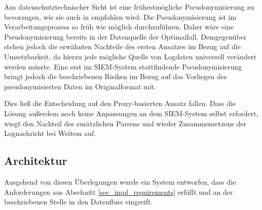 Aus datenschutztechnischer Sicht ist eine frühestmögliche Pseudonymisierung zu bevorzugen, wie sie auch in \cite{schwartmann2017} empfohlen wird: 
\glqq{}Die Pseudonymisierung ist im Verarbeitungsprozess so früh wie möglich durchzuführen.\grqq{}
Daher wäre eine Pseudonymisierung bereits in der Datenquelle der Optimalfall. Demgegenüber stehen jedoch die erwähnten Nachteile des ersten Ansatzes im Bezug auf die Umsetzbarkeit, da hierzu jede mögliche Quelle von Logdaten universell verändert werden müsste. Eine erst im SIEM-System stattfindende Pseudonymisierung bringt jedoch die beschriebenen Risiken im Bezug auf das Vorliegen des pseudonymisierten Daten im Originalformat mit.

Dies ließ die Entscheidung auf den Proxy-basierten Ansatz fallen. Dass die Lösung außerdem noch keine Anpassungen an dem SIEM-System selbst erfordert, wiegt den Nachteil des zusätzlichen Parsens und wieder Zusammensetzens der Lognachricht bei Weitem auf.

\subsection{Architektur}


Ausgehend von diesen Überlegungen wurde ein System entworfen, dass die Anforderungen aus Abschnitt \ref{sec_impl_requirements} erfüllt und an der beschriebenen Stelle in den Datenfluss eingreift. 



